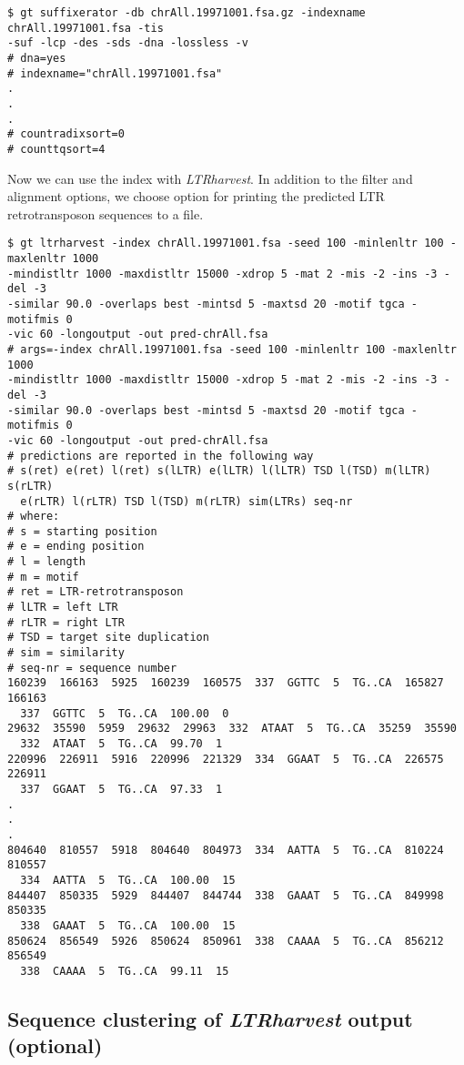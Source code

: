 \documentclass[12pt,titlepage]{article}
\newcommand{\LTRharvest}{\textit{LTRharvest}\xspace}
\begin{document}
\begin{footnotesize}
\begin{verbatim}
$ gt suffixerator -db chrAll.19971001.fsa.gz -indexname chrAll.19971001.fsa -tis
-suf -lcp -des -sds -dna -lossless -v
# dna=yes
# indexname="chrAll.19971001.fsa"
.
.
.
# countradixsort=0
# counttqsort=4
\end{verbatim}
\end{footnotesize}

Now we can use the index with \LTRharvest. In addition to the filter and
alignment options, we choose option  for printing the predicted
LTR retrotransposon sequences to a file.

\begin{footnotesize}
\begin{verbatim}
$ gt ltrharvest -index chrAll.19971001.fsa -seed 100 -minlenltr 100 -maxlenltr 1000
-mindistltr 1000 -maxdistltr 15000 -xdrop 5 -mat 2 -mis -2 -ins -3 -del -3
-similar 90.0 -overlaps best -mintsd 5 -maxtsd 20 -motif tgca -motifmis 0
-vic 60 -longoutput -out pred-chrAll.fsa
# args=-index chrAll.19971001.fsa -seed 100 -minlenltr 100 -maxlenltr 1000
-mindistltr 1000 -maxdistltr 15000 -xdrop 5 -mat 2 -mis -2 -ins -3 -del -3
-similar 90.0 -overlaps best -mintsd 5 -maxtsd 20 -motif tgca -motifmis 0
-vic 60 -longoutput -out pred-chrAll.fsa
# predictions are reported in the following way
# s(ret) e(ret) l(ret) s(lLTR) e(lLTR) l(lLTR) TSD l(TSD) m(lLTR) s(rLTR)
  e(rLTR) l(rLTR) TSD l(TSD) m(rLTR) sim(LTRs) seq-nr
# where:
# s = starting position
# e = ending position
# l = length
# m = motif
# ret = LTR-retrotransposon
# lLTR = left LTR
# rLTR = right LTR
# TSD = target site duplication
# sim = similarity
# seq-nr = sequence number
160239  166163  5925  160239  160575  337  GGTTC  5  TG..CA  165827  166163
  337  GGTTC  5  TG..CA  100.00  0
29632  35590  5959  29632  29963  332  ATAAT  5  TG..CA  35259  35590
  332  ATAAT  5  TG..CA  99.70  1
220996  226911  5916  220996  221329  334  GGAAT  5  TG..CA  226575  226911
  337  GGAAT  5  TG..CA  97.33  1
.
.
.
804640  810557  5918  804640  804973  334  AATTA  5  TG..CA  810224  810557
  334  AATTA  5  TG..CA  100.00  15
844407  850335  5929  844407  844744  338  GAAAT  5  TG..CA  849998  850335
  338  GAAAT  5  TG..CA  100.00  15
850624  856549  5926  850624  850961  338  CAAAA  5  TG..CA  856212  856549
  338  CAAAA  5  TG..CA  99.11  15
\end{verbatim}
\end{footnotesize}

\subsection{Sequence clustering of \LTRharvest output (optional)}
\label{ExampleCluster}
\end{document}
